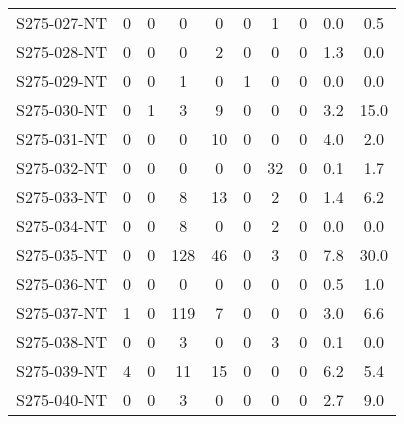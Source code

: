 \begin{longtable}{cccccccccc}
  S275-027-NT & 0 & 0 & 0 & 0 & 0 & 1 & 0 & 0.0 & 0.5 \\ 
  S275-028-NT & 0 & 0 & 0 & 2 & 0 & 0 & 0 & 1.3 & 0.0 \\ 
  S275-029-NT & 0 & 0 & 1 & 0 & 1 & 0 & 0 & 0.0 & 0.0 \\ 
  S275-030-NT & 0 & 1 & 3 & 9 & 0 & 0 & 0 & 3.2 & 15.0 \\ 
  S275-031-NT & 0 & 0 & 0 & 10 & 0 & 0 & 0 & 4.0 & 2.0 \\ 
  S275-032-NT & 0 & 0 & 0 & 0 & 0 & 32 & 0 & 0.1 & 1.7 \\ 
  S275-033-NT & 0 & 0 & 8 & 13 & 0 & 2 & 0 & 1.4 & 6.2 \\ 
  S275-034-NT & 0 & 0 & 8 & 0 & 0 & 2 & 0 & 0.0 & 0.0 \\ 
  S275-035-NT & 0 & 0 & 128 & 46 & 0 & 3 & 0 & 7.8 & 30.0 \\ 
  S275-036-NT & 0 & 0 & 0 & 0 & 0 & 0 & 0 & 0.5 & 1.0 \\ 
  S275-037-NT & 1 & 0 & 119 & 7 & 0 & 0 & 0 & 3.0 & 6.6 \\ 
  S275-038-NT & 0 & 0 & 3 & 0 & 0 & 3 & 0 & 0.1 & 0.0 \\ 
  S275-039-NT & 4 & 0 & 11 & 15 & 0 & 0 & 0 & 6.2 & 5.4 \\ 
  S275-040-NT & 0 & 0 & 3 & 0 & 0 & 0 & 0 & 2.7 & 9.0 \\ 
  \hline
\end{longtable}

